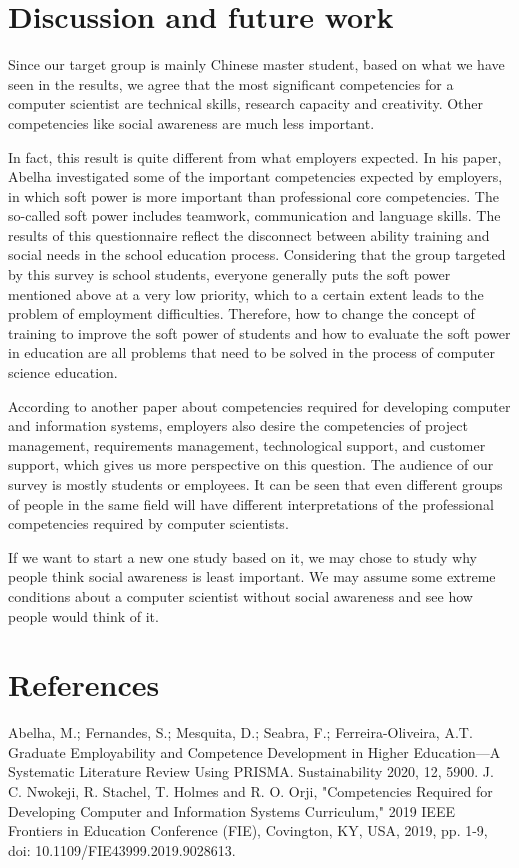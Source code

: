 \documentclass[conference]{IEEEtran}
\begin{document}
\section{Discussion and future work}
\par Since our target group is mainly Chinese master student, based on what we have seen in the results, we agree that the most significant competencies for a computer scientist are technical skills, research capacity and creativity. Other competencies like social awareness are much less important.
\par In fact, this result is quite different from what employers expected. In his paper, Abelha\cite{b1} investigated some of the important competencies expected by employers, in which soft power is more important than professional core competencies. The so-called soft power includes teamwork, communication and language skills. The results of this questionnaire reflect the disconnect between ability training and social needs in the school education process. Considering that the group targeted by this survey is school students, everyone generally puts the soft power mentioned above at a very low priority, which to a certain extent leads to the problem of employment difficulties. Therefore, how to change the concept of training to improve the soft power of students and how to evaluate the soft power in education are all problems that need to be solved in the process of computer science education.
\par According to another paper about competencies required for developing computer and information systems, employers also desire the competencies of project management, requirements management, technological support, and customer support\cite{b2}, which gives us more perspective on this question. The audience of our survey is mostly students or employees. It can be seen that even different groups of people in the same field will have different interpretations of the professional competencies required by computer scientists.
\par If we want to start a new one study based on it, we may chose to study why people think social awareness is least important. We may assume some extreme conditions about a computer scientist without social awareness and see how people would think of it.
\section{References}
\begin{thebibliography}{}
 Abelha, M.; Fernandes, S.; Mesquita, D.; Seabra, F.; Ferreira-Oliveira, A.T. Graduate Employability and Competence Development in Higher Education—A Systematic Literature Review Using PRISMA. Sustainability 2020, 12, 5900.
 J. C. Nwokeji, R. Stachel, T. Holmes and R. O. Orji, "Competencies Required for Developing Computer and Information Systems Curriculum," 2019 IEEE Frontiers in Education Conference (FIE), Covington, KY, USA, 2019, pp. 1-9, doi: 10.1109/FIE43999.2019.9028613.

\end{thebibliography}
\end{document}
